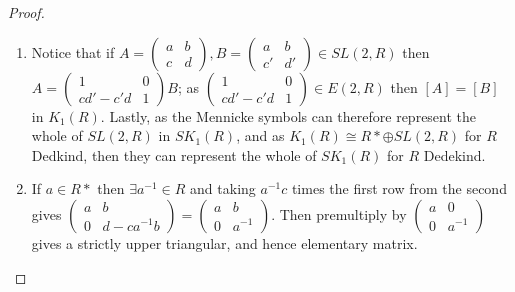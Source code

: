 \documentclass[a4paper,10pt]{article}
\begin{document}
\begin{proof}
\begin{enumerate}
 \item Notice that if $A=\begin{pmatrix} a & b \\ c & d \end{pmatrix}, B=\begin{pmatrix} a & b \\ c' & d' \end{pmatrix}\in SL(2,R)$ then $A=\begin{pmatrix} 1 & 0 \\ cd'-c'd & 1 \end{pmatrix}B$; as $\begin{pmatrix} 1 & 0 \\ cd'-c'd & 1 \end{pmatrix}\in E(2,R)$ then $[A]=[B]$ in $K_{1}(R)$. Lastly, as the Mennicke symbols can therefore represent the whole of $SL(2,R)$ in $SK_{1}(R)$, and as $K_{1}(R)\cong R*\oplus SL(2,R)$ for $R$ Dedkind, then they can represent the whole of $SK_{1}(R)$ for $R$ Dedekind.

 \item If $a\in R*$ then $\exists a^{-1}\in R$ and taking $a^{-1}c$ times the first row from the second gives $\begin{pmatrix} a & b \\ 0 & d-ca^{-1}b \end{pmatrix}=\begin{pmatrix} a & b \\ 0 & a^{-1} \end{pmatrix}$. Then premultiply by $\begin{pmatrix} a & 0 \\ 0 & a^{-1} \end{pmatrix}$ gives a strictly upper triangular, and hence elementary matrix.
 

\end{enumerate}
\end{proof}
\end{document}
